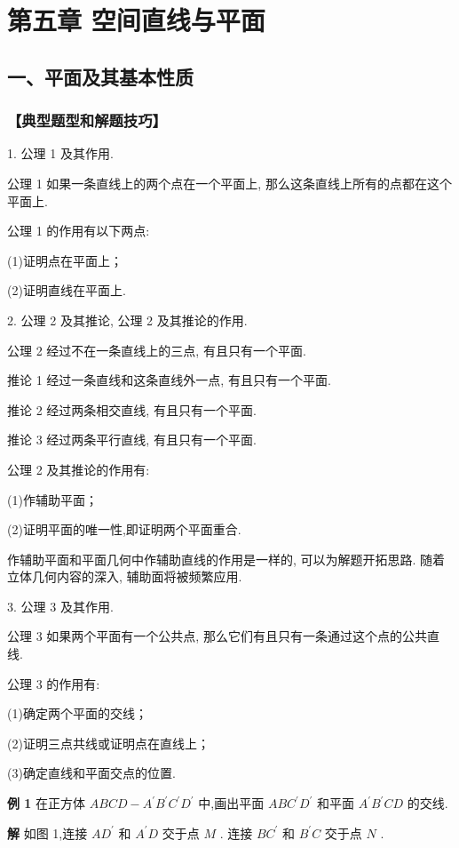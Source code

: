 \chapter*{第五章 空间直线与平面}

\section*{一、平面及其基本性质}

\subsection*{【典型题型和解题技巧】}

1. 公理 1 及其作用.

公理 1 如果一条直线上的两个点在一个平面上, 那么这条直线上所有的点都在这个平面上.

公理 1 的作用有以下两点:

(1)证明点在平面上；

(2)证明直线在平面上.

2. 公理 2 及其推论, 公理 2 及其推论的作用.

公理 2 经过不在一条直线上的三点, 有且只有一个平面.

推论 1 经过一条直线和这条直线外一点, 有且只有一个平面.

推论 2 经过两条相交直线, 有且只有一个平面.

推论 3 经过两条平行直线, 有且只有一个平面.

公理 2 及其推论的作用有:

(1)作辅助平面；

(2)证明平面的唯一性,即证明两个平面重合.

作辅助平面和平面几何中作辅助直线的作用是一样的, 可以为解题开拓思路. 随着立体几何内容的深入, 辅助面将被频繁应用.

3. 公理 3 及其作用.

公理 3 如果两个平面有一个公共点, 那么它们有且只有一条通过这个点的公共直线.

公理 3 的作用有:

(1)确定两个平面的交线；

(2)证明三点共线或证明点在直线上；

(3)确定直线和平面交点的位置.

\textbf{例 1} 在正方体 ${ABCD} - {A}^{\prime }{B}^{\prime }{C}^{\prime }{D}^{\prime }$ 中,画出平面 ${AB}{C}^{\prime }{D}^{\prime }$ 和平面 ${A}^{\prime }{B}^{\prime }{CD}$ 的交线.

\textbf{解} 如图 1,连接 $A{D}^{\prime }$ 和 ${A}^{\prime }D$ 交于点 $M$ . 连接 $B{C}^{\prime }$ 和 ${B}^{\prime }C$ 交于点 $N$ .

